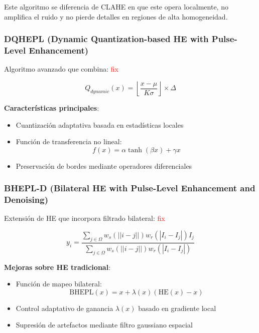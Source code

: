 \documentclass[sigchi]{acmart}
\newcommand{\rojo}[1]{\textcolor{red}{#1}}
\begin{document}
Este algoritmo se diferencia de CLAHE en que este opera localmente, no amplifica el ruido y
no pierde detalles en regiones de alta homogeneidad.

\subsubsection{DQHEPL (Dynamic Quantization-based HE with Pulse-Level Enhancement)}
\label{sssec:dqhepl}
Algoritmo avanzado que combina: \rojo{fix}

\begin{equation}
	Q_{dynamic}(x) = \left\lfloor \frac{x - \mu}{K\sigma} \right\rfloor \times \Delta
\end{equation}

\textbf{Características principales}:
\begin{itemize}
	\item Cuantización adaptativa basada en estadísticas locales
	\item Función de transferencia no lineal:
	      \begin{equation}
		      f(x) = \alpha\tanh(\beta x) + \gamma x
	      \end{equation}
	\item Preservación de bordes mediante operadores diferenciales
\end{itemize}

\subsubsection{BHEPL-D (Bilateral HE with Pulse-Level Enhancement and Denoising)}
\label{sssec:bhepl-d}
Extensión de HE que incorpora filtrado bilateral:
\rojo{fix}

\begin{equation}
	y_i = \frac{\sum_{j\in\Omega} w_s(||i-j||)w_r(|I_i-I_j|)I_j}{\sum_{j\in\Omega} w_s(||i-j||)w_r(|I_i-I_j|)}
\end{equation}

\textbf{Mejoras sobre HE tradicional}:
\begin{itemize}
	\item Función de mapeo bilateral:
	      \begin{equation}
		      \text{BHEPL}(x) = x + \lambda(x)(\text{HE}(x)-x)
	      \end{equation}
	\item Control adaptativo de ganancia $\lambda(x)$ basado en gradiente local
	\item Supresión de artefactos mediante filtro gaussiano espacial
\end{itemize}
\end{document}
